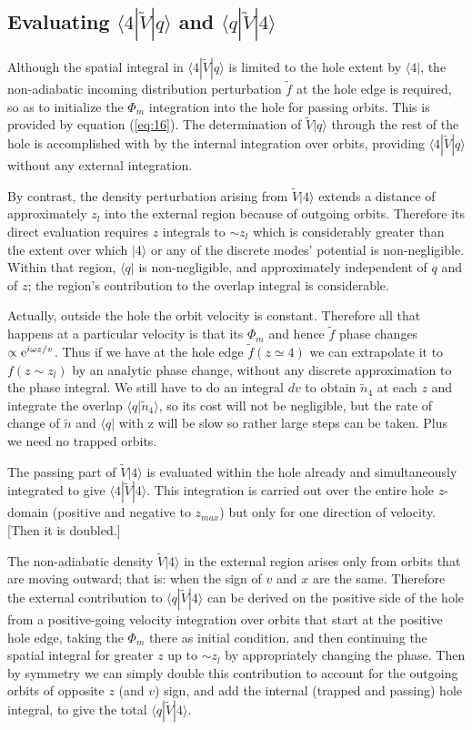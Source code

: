 \documentclass[12pt]{article}
\def\ket#1{|#1\rangle}
\def\bra#1{\langle#1}
\def\etothe#1{{\rm e}^{#1}}
\begin{document}
\subsection{Evaluating $\bra{4}|\tilde{V}\ket{q}$ and $\bra{q}|\tilde{V}\ket{4}$}

Although the spatial integral in $\bra{4}|\tilde{V}\ket{q}$ is limited
to the hole extent by $\bra{4}|$, the non-adiabatic incoming
distribution perturbation $\tilde f$ at the hole edge is required, so
as to initialize the $\Phi_m$ integration into the hole for passing
orbits. This is provided by equation (\ref{eq:16}). The determination
of $\tilde{V}\ket{q}$ through the rest of the hole is accomplished
with by the internal integration over orbits, providing
$\bra{4}|\tilde{V}\ket{q}$ without any external integration.

By contrast, the density perturbation arising from $\tilde{V}\ket{4}$ extends a
distance of approximately $z_l$ into the external region because of
outgoing orbits. Therefore its direct evaluation requires $z$ integrals to
$\sim z_l$ which is considerably greater than the extent over which
$\ket{4}$ or any of the discrete modes' potential is non-negligible.
Within that
region, $\bra{q}|$ is non-negligible, and approximately independent of $q$ and
of $z$; the region's contribution to the overlap integral is considerable.

Actually, outside the hole the orbit velocity is constant. Therefore
all that happens at a particular velocity is that its $\Phi_m$ and hence
$\tilde f$ phase
changes $\propto \etothe{i\omega z/v}$. Thus if we have at the hole
edge $\tilde f(z\simeq4)$ we can extrapolate it to $f(z\sim z_l)$ by an
analytic phase change, without any discrete approximation to the phase
integral. We still have to do an integral $dv$ to obtain $\tilde n_4$
at each $z$ and integrate the overlap $\bra{q}\ket{\tilde n_4}$, so
its cost will not be negligible, but the rate of change of $\tilde n$
and $\bra{q}|$ with z will be slow so rather large steps can be
taken. Plus we need no trapped orbits.

The passing part of $\tilde V \ket{4}$ is evaluated within the hole
already and simultaneously integrated to give
$\bra{4}|\tilde V \ket{4}$. This integration is carried out over the
entire hole $z$-domain (positive and negative to $z_{max}$) but only
for one direction of velocity. [Then it is doubled.]

The non-adiabatic density $\tilde V \ket{4}$ in the external region
arises only from orbits that are moving outward; that is: when the
sign of $v$ and $x$ are the same. Therefore the external contribution
to $\bra{q}|\tilde V \ket{4}$ can be derived on the positive side of
the hole from a positive-going velocity integration over orbits that
start at the positive hole edge, taking the $\Phi_m$ there as initial
condition, and then continuing the spatial integral for greater $z$ up
to $\sim z_l$ by appropriately changing the phase.  Then by symmetry
we can simply double this contribution to account for the outgoing
orbits of opposite $z$ (and $v$) sign, and add the internal (trapped
and passing) hole integral, to give the total
$\bra{q}|\tilde V \ket{4}$.
\end{document}
